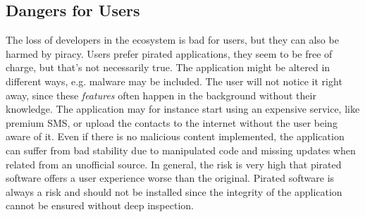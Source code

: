 \subsection{Dangers for Users} \label{subsection:foundation-piracy-users}
The loss of developers in the ecosystem is bad for users, but they can also be harmed by piracy.
Users prefer pirated applications, they seem to be free of charge, but that's not necessarily true.
The application might be altered in different ways, e.g. malware may be included.
The user will not notice it right away, since these \textit{features} often happen in the background without their knowledge.
The application may for instance start using an expensive service, like premium SMS, or upload the contacts to the internet without the user being aware of it.
Even if there is no malicious content implemented, the application can suffer from bad stability due to manipulated code and missing updates when related from an unofficial source.
In general, the risk is very high that pirated software offers a user experience worse than the original. \cite{bitdefenderPlagiarism} \cite{lierschDeveloperThreats}
\newline
Pirated software is always a risk and should not be installed since the integrity of the application cannot be ensured without deep inspection.
